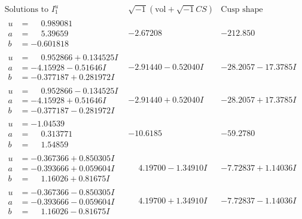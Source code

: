 \documentclass[1p]{elsarticle_modified}
\theoremstyle{definition}
\newcommand{\I}{\sqrt{-1}}
\begin{document}
$$\begin{array}{c|c|c}  
\text{Solutions to }I^u_{1}& \I (\text{vol} + \sqrt{-1}CS) & \text{Cusp shape}\\
 \hline 
\begin{aligned}
u &= \phantom{-}0.989081\phantom{ +0.000000I} \\
a &= \phantom{-}5.39659\phantom{ +0.000000I} \\
b &= -0.601818\phantom{ +0.000000I}\end{aligned}
 & -2.67208\phantom{ +0.000000I} & -212.850\phantom{ +0.000000I} \\ \hline\begin{aligned}
u &= \phantom{-}0.952866 + 0.134525 I \\
a &= -4.15928 - 0.51646 I \\
b &= -0.377187 + 0.281972 I\end{aligned}
 & -2.91440 - 0.52040 I & -28.2057 - 17.3785 I \\ \hline\begin{aligned}
u &= \phantom{-}0.952866 - 0.134525 I \\
a &= -4.15928 + 0.51646 I \\
b &= -0.377187 - 0.281972 I\end{aligned}
 & -2.91440 + 0.52040 I & -28.2057 + 17.3785 I \\ \hline\begin{aligned}
u &= -1.04539\phantom{ +0.000000I} \\
a &= \phantom{-}0.313771\phantom{ +0.000000I} \\
b &= \phantom{-}1.54859\phantom{ +0.000000I}\end{aligned}
 & -10.6185\phantom{ +0.000000I} & -59.2780\phantom{ +0.000000I} \\ \hline\begin{aligned}
u &= -0.367366 + 0.850305 I \\
a &= -0.393666 + 0.059604 I \\
b &= \phantom{-}1.16026 + 0.81675 I\end{aligned}
 & \phantom{-}4.19700 - 1.34910 I & -7.72837 + 1.14036 I \\ \hline\begin{aligned}
u &= -0.367366 - 0.850305 I \\
a &= -0.393666 - 0.059604 I \\
b &= \phantom{-}1.16026 - 0.81675 I\end{aligned}
 & \phantom{-}4.19700 + 1.34910 I & -7.72837 - 1.14036 I \\ \hline\begin{aligned}

\end{aligned}
\end{array}$$
\end{document}

